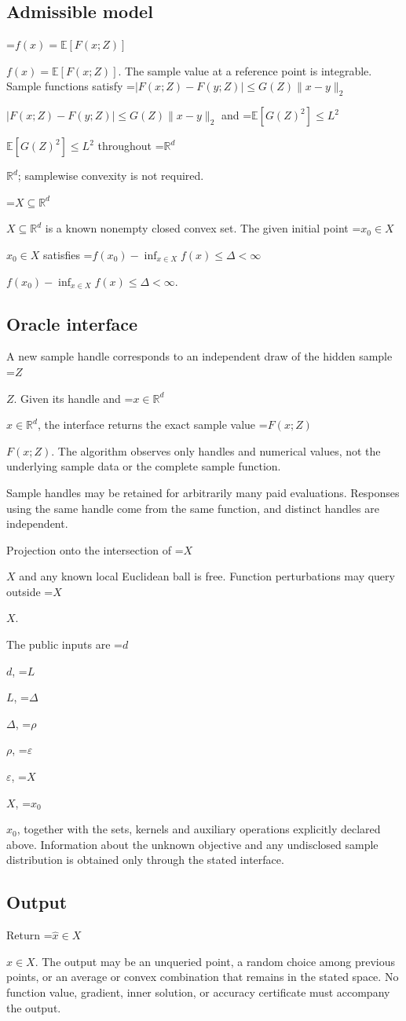\documentclass[10pt,a4paper]{article}
\newcommand{\AtlasMath}[1]{\par\begingroup\centering\setbox0=\hbox{$\displaystyle #1$}\ifdim\wd0>1.4\linewidth\typeout{ATLAS WIDE FORMULA: \the\wd0}\fi\ifdim\wd0>\linewidth\resizebox{\linewidth}{!}{\box0}\else\box0\fi\par\endgroup}
\newcommand{\AtlasInlineMath}[1]{\begingroup\setbox0=\hbox{$#1$}\ifdim\wd0>.4\linewidth\endgroup\AtlasMath{#1}\else\endgroup$#1$\fi}
\begin{document}
\subsection{Admissible model}
\AtlasInlineMath{f(x)=\mathbb{E}[F(x;Z)]}. The sample value at a reference point is integrable. Sample functions satisfy \AtlasInlineMath{|F(x;Z)-F(y;Z)|\le G(Z)\|x-y\|_2} and \AtlasInlineMath{\mathbb{E}[G(Z)^2]\le L^2} throughout \AtlasInlineMath{\mathbb{R}^d}; samplewise convexity is not required.

\AtlasInlineMath{X\subseteq\mathbb{R}^d} is a known nonempty closed convex set. The given initial point \AtlasInlineMath{x_0\in X} satisfies \AtlasInlineMath{f(x_0)-\inf_{x\in X}f(x)\le\Delta<\infty}.

\subsection{Oracle interface}
A new sample handle corresponds to an independent draw of the hidden sample \AtlasInlineMath{Z}. Given its handle and \AtlasInlineMath{x\in \mathbb{R}^d}, the interface returns the exact sample value \AtlasInlineMath{F(x;Z)}. The algorithm observes only handles and numerical values, not the underlying sample data or the complete sample function.

Sample handles may be retained for arbitrarily many paid evaluations. Responses using the same handle come from the same function, and distinct handles are independent.

Projection onto the intersection of \AtlasInlineMath{X} and any known local Euclidean ball is free. Function perturbations may query outside \AtlasInlineMath{X}.

The public inputs are \AtlasInlineMath{d}, \AtlasInlineMath{L}, \AtlasInlineMath{\Delta}, \AtlasInlineMath{\rho}, \AtlasInlineMath{\varepsilon}, \AtlasInlineMath{X}, \AtlasInlineMath{x_0}, together with the sets, kernels and auxiliary operations explicitly declared above. Information about the unknown objective and any undisclosed sample distribution is obtained only through the stated interface.

\subsection{Output}
Return \AtlasInlineMath{\widehat{x}\in X}. The output may be an unqueried point, a random choice among previous points, or an average or convex combination that remains in the stated space. No function value, gradient, inner solution, or accuracy certificate must accompany the output.
\end{document}
